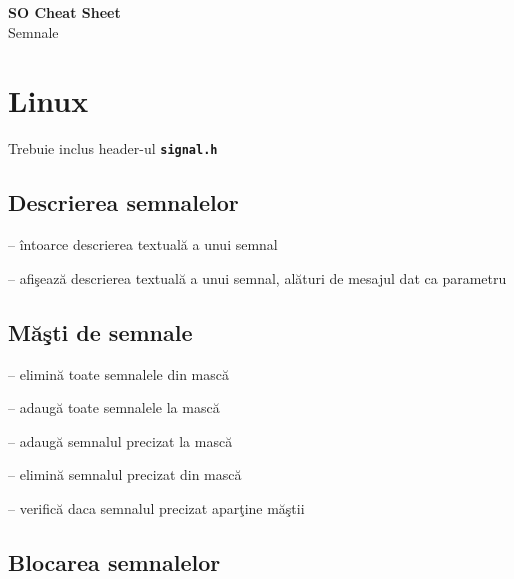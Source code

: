 \documentclass{refcard.cs.pub.ro}
\begin{document}
\raggedright
\footnotesize
\begin{multicols*}{3}

\setlength{\columnseprule}{0.25pt}
\setlength{\premulticols}{1pt}
\setlength{\postmulticols}{1pt}
\setlength{\multicolsep}{1pt}
\setlength{\columnsep}{2pt}

\begin{center}
     \Large{\textbf{SO Cheat Sheet}} \\
      {Semnale}\\
\end{center}

\section{Linux}

Trebuie inclus header-ul \textbf{\texttt{signal.h}}

\subsection{Descrierea semnalelor}

 -- întoarce descrierea textuală a unui semnal

 -- afişează descrierea textuală a unui semnal, alături de mesajul dat ca parametru

\subsection{Măşti de semnale}

 -- elimină toate semnalele din mască

 -- adaugă toate semnalele la mască

 -- adaugă semnalul precizat la mască

 -- elimină semnalul precizat din mască

 -- verifică daca semnalul precizat aparţine măştii

\subsection{Blocarea semnalelor}


\end{multicols*}
\end{document}
